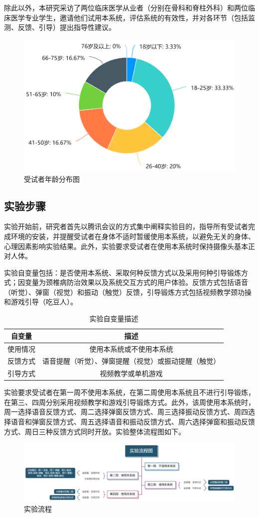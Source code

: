 \documentclass[12pt,a4paper]{article}%
\begin{document}
除此以外，本研究采访了两位临床医学从业者（分别在骨科和脊柱外科）和两位临床医学专业学生，邀请他们试用本系统，评估系统的有效性，并对各环节（包括监测、反馈、引导）提出指导性建议。
\begin{figure}[H]
\centering
\includegraphics[width=.6\textwidth]{./Part3-Design.pic/age_distribution.png}
\caption{受试者年龄分布图}
\end{figure}
\subsection{实验步骤}
实验开始前，研究者首先以腾讯会议的方式集中阐释实验目的，指导所有受试者完成环境的安装，并提醒受试者在身体不适时暂缓使用本系统，以避免无关的身体、心理因素影响实验结果。此外，实验要求受试者在使用本系统时保持摄像头基本正对人体。


实验自变量包括：是否使用本系统、采取何种反馈方式以及采用何种引导锻炼方式；因变量为颈椎病防治效果以及系统交互方式的用户体验。反馈方式包括语音（听觉）、弹窗（视觉）和振动（触觉）反馈，引导锻炼方式包括视频教学颈功操和游戏引导（吃豆人）。
\begin{table}[!htbp]
\center
\caption{实验自变量描述}
\begin{tabular}{cc}
	\toprule
	自变量 & 描述\\
	\midrule
	使用情况&使用本系统或不使用本系统\\
	反馈方式& 语音提醒（听觉）、弹窗提醒（视觉）或振动提醒（触觉）\\
	引导方式 &视频教学或单机游戏\\
	\bottomrule
\end{tabular}
\end{table}

实验要求受试者在第一周不使用本系统，在第二周使用本系统且不进行引导锻炼，在第三、四周分别采用视频教学和游戏引导锻炼方式。此外，该周使用本系统时，周一选择语音反馈方式、周二选择弹窗反馈方式、周三选择振动反馈方式、周四选择语音和弹窗反馈方式、周五选择语音和振动反馈方式、周六选择弹窗和振动反馈方式、周日三种反馈方式同时开放。实验整体流程图如下。
\begin{figure}[H]
\centering
\includegraphics[width=.9\textwidth]{./Part3-Design.pic/exp_procedure.png}
\caption{实验流程}
\end{figure}
\end{document}
